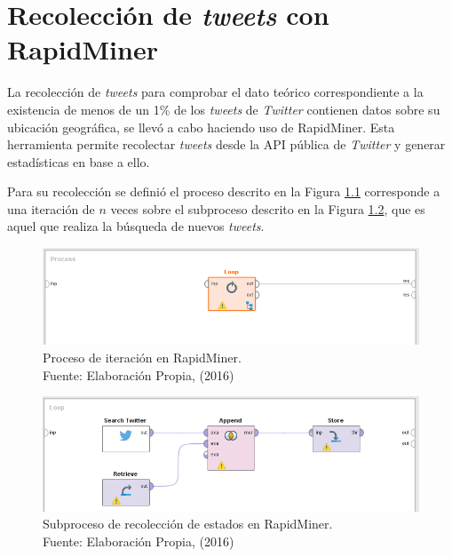 
\chapter{Recolección de \textit{tweets} con RapidMiner}
\label{apendice:apendice1}

La recolección de \textit{tweets} para comprobar el dato teórico correspondiente a la existencia de menos de un 1\% de los \textit{tweets} de \textit{Twitter} contienen datos sobre su ubicación geográfica, se llevó a cabo haciendo uso de RapidMiner. Esta herramienta permite recolectar \textit{tweets} desde la API pública de \textit{Twitter} y generar estadísticas en base a ello.

Para su recolección se definió el proceso descrito en la Figura \ref{fig:RMP} corresponde a una iteración de $n$ veces sobre el subproceso descrito en la Figura \ref{fig:RMSP}, que es aquel que realiza la búsqueda de nuevos \textit{tweets}.

\begin{figure}[H]
        \centering
        \captionsetup{justification=centering}
        \includegraphics[scale=0.8]{images/RMProcess.png}
        \caption[Proceso de iteración en RapidMiner.]{Proceso de iteración en RapidMiner.\\Fuente: Elaboración Propia, (2016)}
        \label{fig:RMP}
\end{figure}

\begin{figure}[H]
        \centering
        \captionsetup{justification=centering}
        \includegraphics[scale=0.8]{images/RMSProcess.png}
        \caption[Subproceso de recolección de estados en RapidMiner.]{Subproceso de recolección de estados en RapidMiner.\\Fuente: Elaboración Propia, (2016)}
        \label{fig:RMSP}
\end{figure}


